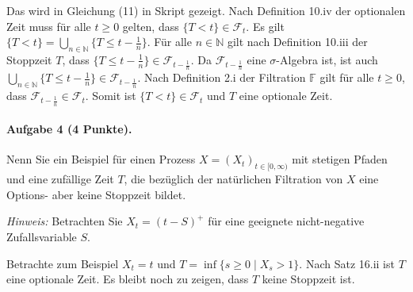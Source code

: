 \documentclass{article}
\begin{document}
Das wird in Gleichung  (11) in Skript gezeigt.
Nach Definition 10.iv der optionalen Zeit muss für alle $t\geq0$ gelten, dass $\{T<t\}\in\mathscr{F}_t$.
Es gilt $\{T<t\}=\bigcup_{n\in \mathbb{N}}\bigl\{T\leq t-\frac{1}{n}\bigr\}$.
Für alle $n\in\mathbb{N}$ gilt nach Definition 10.iii der Stoppzeit $T$, dass $\bigl\{T\leq t-\frac{1}{n}\bigr\}\in\mathscr{F}_{t-\frac{1}{n}}$.
Da $\mathscr{F}_{t-\frac{1}{n}}$ eine $\sigma$-Algebra ist, ist auch $\bigcup_{n\in \mathbb{N}}\bigl\{T\leq t-\frac{1}{n}\bigr\}\in\mathscr{F}_{t-\frac{1}{n}}$.
Nach Definition 2.i der Filtration $\mathbb{F}$ gilt für alle $t\geq0$, dass $\mathscr{F}_{t-\frac{1}{n}}\in\mathscr{F}_t$.
Somit ist $\{T<t\}\in\mathscr{F}_t$ und $T$ eine optionale Zeit.

\paragraph{Aufgabe 4 \textnormal{(4 Punkte)}.}
Nenn Sie ein Beispiel für einen  Prozess $X=(X_t)_{t\in[0,\infty)}$ mit stetigen Pfaden und eine zufällige Zeit $T$, die bezüglich der natürlichen Filtration von $X$ eine Options- aber keine Stoppzeit bildet.

\noindent\emph{Hinweis:} Betrachten Sie $X_t=(t-S)^+$ für eine geeignete nicht-negative Zufallsvariable $S$.

Betrachte zum Beispiel $X_t=t$ und $T=\inf\{s\geq0\mid X_s>1\}$.
Nach Satz 16.ii ist $T$ eine optionale Zeit.
Es bleibt noch zu zeigen, dass $T$ keine Stoppzeit ist.

\end{document}
